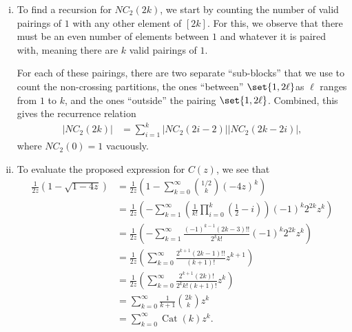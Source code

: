 \documentclass[10pt]{mypackage}
\begin{document}
\begin{solution}\hfill
  \begin{enumerate}[(i)]
    \item To find a recursion for $NC_2(2k)$, we start by counting the number of valid pairings of $1$ with any other element of $[2k]$. For this, we observe that there must be an even number of elements between $1$ and whatever it is paired with, meaning there are $k$ valid pairings of $1$.

      For each of these pairings, there are two separate ``sub-blocks'' that we use to count the non-crossing partitions, the ones ``between'' $\set{1,2\ell}$as $\ell$ ranges from $1$ to $k$, and the ones ``outside'' the pairing $\set{1,2\ell}$. Combined, this gives the recurrence relation
      \begin{align*}
        \left\vert NC_2(2k) \right\vert &= \sum_{i=1}^{k} \left\vert NC_2\left( 2i-2 \right) \right\vert\left\vert NC_2\left( 2k-2i \right) \right\vert,
      \end{align*}
      where $NC_2\left( 0 \right) = 1$ vacuously.
    \item To evaluate the proposed expression for $C(z)$, we see that
      \begin{align*}
        \frac{1}{2z} \left( 1-\sqrt{1-4z} \right) &= \frac{1}{2z} \left( 1-\sum_{k=0}^{\infty} {1/2\choose k} \left( -4z \right)^{k} \right)\\
                                                  &= \frac{1}{2z} \left( -\sum_{k=1}^{\infty} \left( \frac{1}{k!}\prod_{i=0}^{k} \left( \frac{1}{2}-i \right) \right)\left( -1 \right)^{k}2^{2k}z^{k} \right)\\
                                                  &= \frac{1}{2z}\left( -\sum_{k=1}^{\infty} \frac{\left( -1 \right)^{k-1}\left( 2k-3 \right)!!}{2^{k}k!} \left( -1 \right)^{k}2^{2k}z^{k} \right)\\
                                                  &= \frac{1}{2z}\left( \sum_{k=0}^{\infty} \frac{2^{k+1}\left( 2k-1 \right)!!}{\left( k+1 \right)!}z^{k+1}\right)\\
                                                  &= \frac{1}{2z}\left( \sum_{k=0}^{\infty}\frac{2^{k+1}\left( 2k \right)!}{2^{k}k! \left( k+1 \right)!}z^{k} \right)\\
                                                  &= \sum_{k=0}^{\infty}\frac{1}{k+1}{2k\choose k} z^{k}\\
                                                  &= \sum_{k=0}^{\infty} \operatorname{Cat}(k)z^{k}.

\end{align*}
\end{enumerate}
\end{solution}
\end{document}
